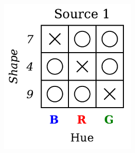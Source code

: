 \begin{definition}
\begin{figure}[H]
        \begin{subfigure}[b]{0.45\textwidth}
            \centering
            \begin{subfigure}[b]{0.48\textwidth}
                \centering
                \includegraphics[width=\textwidth]{img/datasets/ZGO_fact=hue_env=0.pdf}
            \end{subfigure}
            \begin{subfigure}[b]{0.48\textwidth}
                \centering

\end{subfigure}
\end{subfigure}
\end{figure}
\end{definition}
